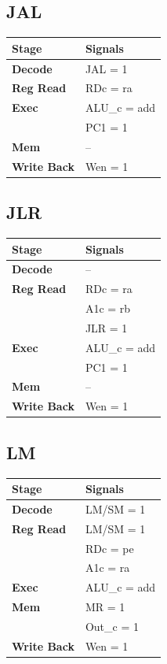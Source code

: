 \documentclass{article}
\begin{document}
\subsection*{JAL}
\begin{tabular}{|l|l|}
\hline
\textbf{Stage} & \textbf{Signals}\\
\hline
\textbf{Decode} & JAL = 1\\
\hline
\textbf{Reg Read} & RDc = ra\\
\hline
\textbf{Exec} & ALU\_c = add\\
              & PC1 = 1\\
\hline
\textbf{Mem} & --\\
\hline
\textbf{Write Back} & Wen = 1\\
\hline
\end{tabular}

\subsection*{JLR}
\begin{tabular}{|l|l|}
\hline
\textbf{Stage} & \textbf{Signals}\\
\hline
\textbf{Decode} & --\\
\hline
\textbf{Reg Read} & RDc = ra\\
                  & A1c = rb\\
                  & JLR = 1\\
\hline
\textbf{Exec} & ALU\_c = add\\
              & PC1 = 1\\
\hline
\textbf{Mem} & --\\
\hline
\textbf{Write Back} & Wen = 1\\
\hline
\end{tabular}

\subsection*{LM}
\begin{tabular}{|l|l|}
\hline
\textbf{Stage} & \textbf{Signals}\\
\hline
\textbf{Decode} & LM/SM = 1\\
\hline
\textbf{Reg Read} & LM/SM = 1\\
                  & RDc = pe\\
                  & A1c = ra\\
\hline
\textbf{Exec} & ALU\_c = add\\
\hline
\textbf{Mem} & MR = 1\\
             & Out\_c = 1\\
\hline
\textbf{Write Back} & Wen = 1\\
\hline
\end{tabular}
\end{document}
